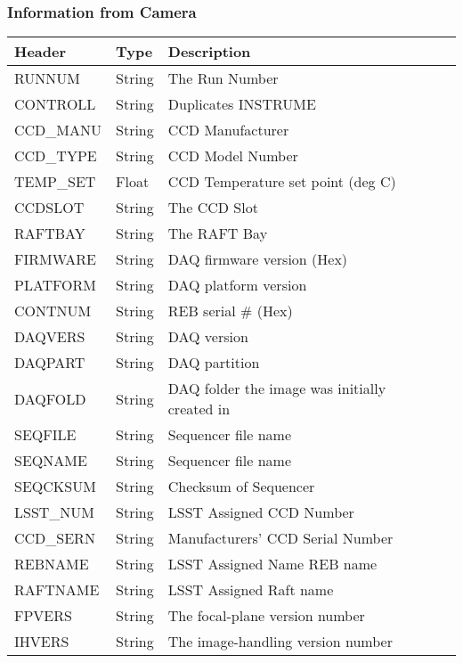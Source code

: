 \subsubsection{Information from Camera}
\begin{tabular}{l l l l l}

\hline
Header & Type & Description \\
\hline
RUNNUM & String & The Run Number \\
CONTROLL & String & Duplicates INSTRUME \\
CCD\_MANU & String & CCD Manufacturer \\
CCD\_TYPE & String & CCD Model Number \\
TEMP\_SET & Float & CCD Temperature set point (deg C) \\
CCDSLOT & String & The CCD Slot \\
RAFTBAY & String & The RAFT Bay \\
FIRMWARE & String & DAQ firmware version (Hex) \\
PLATFORM & String & DAQ platform version \\
CONTNUM & String & REB serial \# (Hex) \\
DAQVERS & String & DAQ version \\
DAQPART & String & DAQ partition \\
DAQFOLD & String & DAQ folder the image was initially created in \\
SEQFILE & String & Sequencer file name \\
SEQNAME & String & Sequencer file name \\
SEQCKSUM & String & Checksum of Sequencer \\
LSST\_NUM & String & LSST Assigned CCD Number \\
CCD\_SERN & String & Manufacturers’ CCD Serial Number \\
REBNAME & String & LSST Assigned Name REB name \\
RAFTNAME & String & LSST Assigned Raft name \\
FPVERS & String & The focal-plane version number \\
IHVERS & String & The image-handling version number \\
\hline
\end{tabular}


